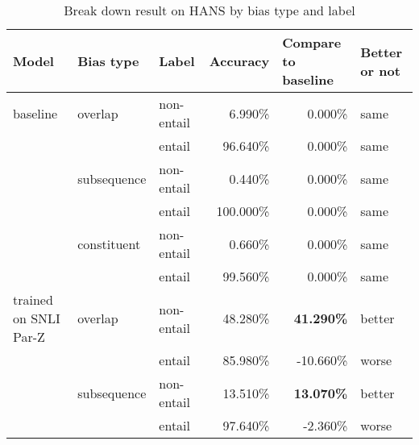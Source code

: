 \documentclass{article}
\begin{document}
\begin{table}[]
    \label{table10}
    \caption{Break down result on HANS by bias type and label}
    \begin{tabular}{lllrrl}
        \textbf{Model}                   & \textbf{Bias type}   & \textbf{Label}      & \multicolumn{1}{l}{\textbf{Accuracy}} & \multicolumn{1}{l}{\textbf{Compare to baseline}} & \textbf{Better or not} \\ \hline
        baseline                         & overlap             & non-entail          & 6.990\%                                & 0.000\%                                         & same          \\
                                          &                     & entail              & 96.640\%                               & 0.000\%                                         & same          \\
                                          & subsequence         & non-entail          & 0.440\%                                & 0.000\%                                         & same          \\
                                          &                     & entail              & 100.000\%                              & 0.000\%                                         & same          \\
                                          & constituent         & non-entail          & 0.660\%                                & 0.000\%                                         & same          \\
                                          &                     & entail              & 99.560\%                               & 0.000\%                                         & same          \\
        trained on SNLI Par-Z            & overlap             & non-entail          & 48.280\%                               & \textbf{41.290\%}                               & better        \\
                                          &                     & entail              & 85.980\%                               & -10.660\%                                       & worse         \\
                                          & subsequence         & non-entail          & 13.510\%                               & \textbf{13.070\%}                               & better        \\
                                          &                     & entail              & 97.640\%                               & -2.360\%                                        & worse         \\

\end{tabular}
\end{table}
\end{document}
